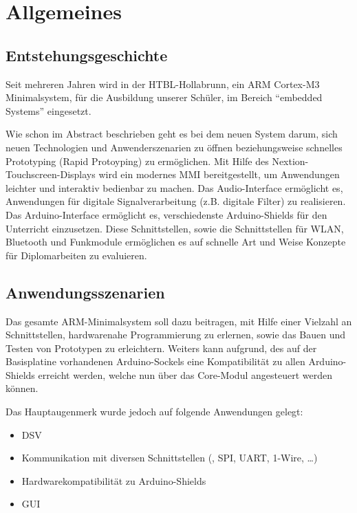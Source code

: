 \section{Allgemeines}
\label{sec:allgemeines}

\subsection{Entstehungsgeschichte}
\label{sec:entstehungsgeschichte}

Seit mehreren Jahren wird in der HTBL-Hollabrunn, ein \gls{ARM} Cortex-M3 \gls{Minimalsystem}, für die Ausbildung unserer Schüler, im Bereich \enquote{embedded Systems} eingesetzt.

Wie schon im Abstract beschrieben geht es bei dem neuen System darum, sich neuen Technologien und Anwenderszenarien zu öffnen beziehungsweise schnelles Prototyping (Rapid Protoyping) zu ermöglichen. Mit Hilfe des Nextion-Touchscreen-Displays wird ein modernes \gls{MMI} bereitgestellt, um Anwendungen leichter und interaktiv bedienbar zu machen. Das Audio-Interface ermöglicht es, Anwendungen für digitale Signalverarbeitung (z.B. digitale Filter) zu realisieren. Das Arduino-Interface ermöglicht es, verschiedenste Arduino-Shields für den Unterricht einzusetzen. Diese Schnittstellen, sowie die Schnittstellen für WLAN, Bluetooth und Funkmodule ermöglichen es auf schnelle Art und Weise Konzepte für Diplomarbeiten zu evaluieren.

\subsection{Anwendungsszenarien}
\label{sec:anwendungsszenarien}

Das gesamte \gls{ARM}-\gls{Minimalsystem} soll dazu beitragen, mit Hilfe einer Vielzahl an Schnittstellen, hardwarenahe Programmierung zu erlernen, sowie das Bauen und Testen von Prototypen zu erleichtern. Weiters kann aufgrund, des auf der \gls{Basisplatine} vorhandenen Arduino-Sockels eine Kompatibilität zu allen Arduino-Shields erreicht werden, welche nun über das \gls{Core-Modul} angesteuert werden können.

Das Hauptaugenmerk wurde jedoch auf folgende Anwendungen gelegt:

\begin{itemize}
    \item \gls{DSV}
    \item Kommunikation mit diversen Schnittstellen (\IIC{}, SPI, UART, 1-Wire, \dots{})
    \item Hardwarekompatibilität zu Arduino-Shields
    \item \gls{GUI}
\end{itemize}

